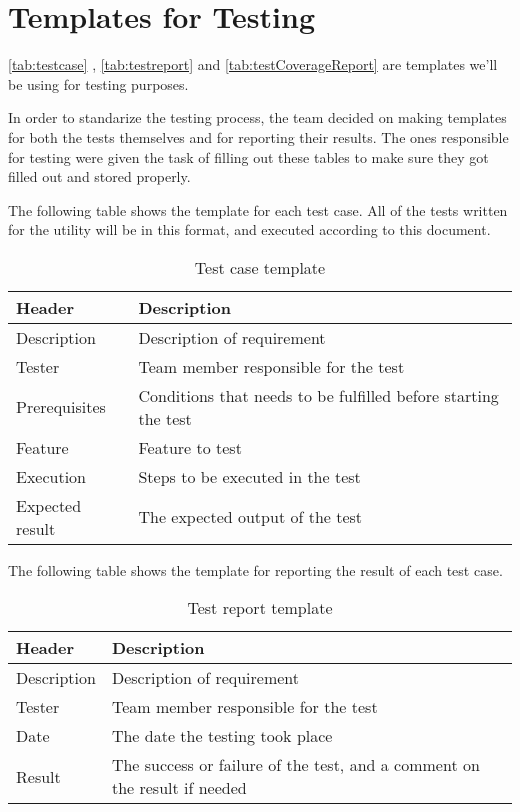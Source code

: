 \section{Templates for Testing}
\autoref{tab:testcase} , \autoref{tab:testreport} and \autoref{tab:testCoverageReport} are templates we'll be
using for testing purposes.

In order to standarize the testing process, the team decided on making templates for both the tests themselves and for reporting their results. The ones responsible for testing were given the task of filling out these tables to make sure they got filled out and stored properly.

The following table shows the template for each test case. All of the tests written for the utility will be in this format, and executed according to this document.

\begin{table}[htb] \small \center
\caption{Test case template \label{tab:testcase}}
\begin{tabular}{l l}
	\toprule
	Header & Description \\
	\midrule
	Description & Description of requirement \\
	Tester & Team member responsible for the test \\
	Prerequisites & Conditions that needs to be fulfilled before starting the test \\
	Feature & Feature to test \\
	Execution & Steps to be executed in the test \\
	Expected result & The expected output of the test \\
	\bottomrule
\end{tabular}
\end{table}

The following table shows the template for reporting the result of each test case.

\begin{table}[htb] \small \center
\caption{Test report template \label{tab:testreport}}
\begin{tabular}{l l}
	\toprule
	Header & Description \\
	\midrule
	Description & Description of requirement \\
	Tester & Team member responsible for the test \\
	Date & The date the testing took place \\
	Result & The success or failure of the test, and a comment on the result if needed \\
	\bottomrule
\end{tabular}
\end{table}

